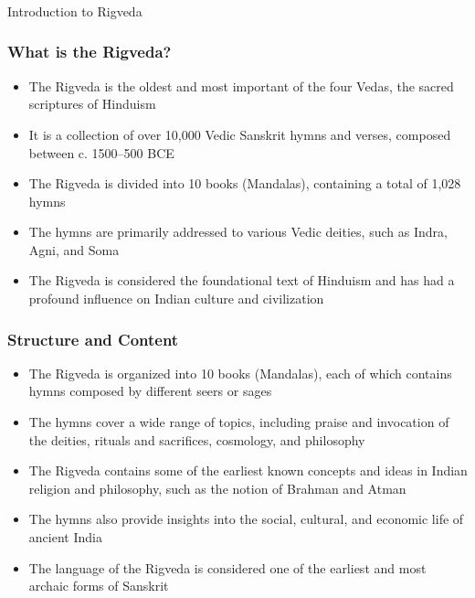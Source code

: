 \begin{frame}[fragile]\frametitle{}
\begin{center}
{\Large Introduction to Rigveda}
\end{center}
\end{frame}

\begin{frame}[fragile]\frametitle{What is the Rigveda?}
    \begin{itemize}
        \item The Rigveda is the oldest and most important of the four Vedas, the sacred scriptures of Hinduism
        \item It is a collection of over 10,000 Vedic Sanskrit hymns and verses, composed between c. 1500–500 BCE
        \item The Rigveda is divided into 10 books (Mandalas), containing a total of 1,028 hymns
        \item The hymns are primarily addressed to various Vedic deities, such as Indra, Agni, and Soma
        \item The Rigveda is considered the foundational text of Hinduism and has had a profound influence on Indian culture and civilization
    \end{itemize}
\end{frame}

\begin{frame}[fragile]\frametitle{Structure and Content}
    \begin{itemize}
        \item The Rigveda is organized into 10 books (Mandalas), each of which contains hymns composed by different seers or sages
        \item The hymns cover a wide range of topics, including praise and invocation of the deities, rituals and sacrifices, cosmology, and philosophy
        \item The Rigveda contains some of the earliest known concepts and ideas in Indian religion and philosophy, such as the notion of Brahman and Atman
        \item The hymns also provide insights into the social, cultural, and economic life of ancient India
        \item The language of the Rigveda is considered one of the earliest and most archaic forms of Sanskrit
    \end{itemize}
\end{frame}

